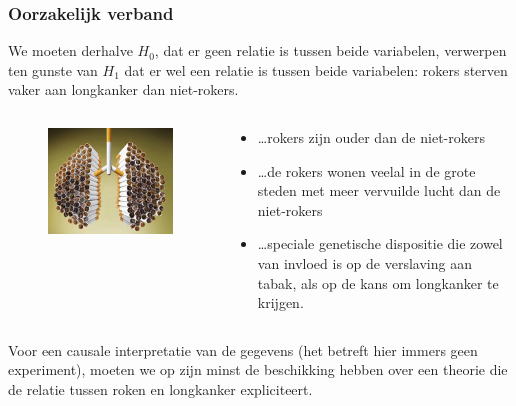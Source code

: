 \documentclass[aspectratio=169]{beamer}
\begin{document}
\begin{frame}
  \frametitle{Oorzakelijk verband}
  We moeten derhalve $H_{0}$, dat er geen relatie is tussen beide variabelen, verwerpen ten gunste van $H_{1}$ dat er wel een relatie is tussen beide variabelen: rokers sterven vaker aan longkanker dan niet-rokers.
  \begin{columns}
  \begin{column}{0.3 \textwidth}

  \begin{figure}
    \centering
      \includegraphics[width=1.00\textwidth]{img/les-6-smoking2.jpg}
  \end{figure}

  \end{column}
  \begin{column}{0.7 \textwidth}

  \begin{itemize}
    \item  \dots rokers zijn ouder dan de niet-rokers
    \item \dots de rokers wonen veelal in de grote steden met
meer vervuilde lucht dan de niet-rokers
    \item \dots speciale genetische dispositie die zowel van invloed is op de verslaving aan tabak, als op de kans om longkanker te krijgen.
  \end{itemize}
  \end{column}
\end{columns}
Voor een causale interpretatie van de gegevens (het betreft hier immers geen experiment), moeten we op zijn minst de beschikking hebben over een theorie die de relatie tussen roken en longkanker expliciteert.

\end{frame}
\end{document}

